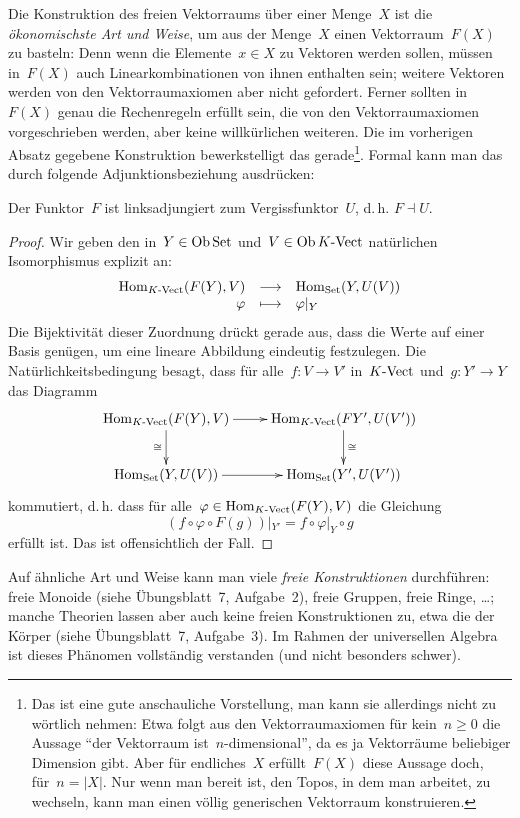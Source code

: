 Die Konstruktion des freien Vektorraums über einer Menge~$X$ ist die
\emph{ökonomischste Art und Weise}, um aus der Menge~$X$ einen
Vektorraum~$F(X)$ zu basteln: Denn wenn die Elemente~$x \in X$ zu Vektoren
werden sollen, müssen in~$F(X)$ auch Linearkombinationen von ihnen enthalten
sein; weitere Vektoren werden von den Vektorraumaxiomen aber nicht gefordert.
Ferner sollten in~$F(X)$ genau die Rechenregeln erfüllt sein, die von den
Vektorraumaxiomen vorgeschrieben werden, aber keine willkürlichen
weiteren. Die im vorherigen Absatz gegebene Konstruktion
bewerkstelligt das gerade\footnote{Das ist eine gute anschauliche Vorstellung, man kann sie
allerdings nicht zu wörtlich nehmen: Etwa folgt aus den Vektorraumaxiomen für
kein~$n \geq 0$ die Aussage "`der Vektorraum ist~$n$-dimensional"', da es ja
Vektorräume beliebiger Dimension gibt. Aber für endliches~$X$ erfüllt~$F(X)$
diese Aussage doch, für~$n = |X|$. Nur wenn man bereit ist, den Topos, in dem man
arbeitet, zu wechseln, kann man einen völlig generischen Vektorraum
konstruieren.}. Formal kann man das durch folgende Adjunktionsbeziehung
ausdrücken:
\begin{prop}Der Funktor~$F$ ist
linksadjungiert zum Vergissfunktor~$U$, d.\,h. $F \dashv U$.
\end{prop}
\begin{proof}
Wir geben den in~$Y \in \operatorname{Ob}\mathrm{Set}$ und~$V \in \operatorname{Ob}{K\text{-}\mathrm{Vect}}$ natürlichen
Isomorphismus explizit an:
\[ \begin{array}{@{}rcl@{}}
  \Hom_{\Vect{K}}(F(Y), V) &\longrightarrow& \Hom_\Set(Y, U(V)) \\
  \varphi &\longmapsto& \varphi|_Y
\end{array} \]
Die Bijektivität dieser Zuordnung drückt gerade aus, dass die Werte auf einer
Basis genügen, um eine lineare Abbildung eindeutig festzulegen. Die
Natürlichkeitsbedingung besagt, dass für alle~$f:V \to V'$ in~${K\text{-}\mathrm{Vect}}$ und~$g:Y' \to Y$
das Diagramm
\[ \xymatrix{
  \Hom_{\Vect{K}}(F(Y),V) \ar[r] \ar[d]_\cong & \Hom_{\Vect{K}}(FY',U(V')) \ar[d]^\cong \\
  \Hom_\Set(Y,U(V)) \ar[r] & \Hom_\Set(Y',U(V'))
} \]
kommutiert, d.\,h. dass für alle~$\varphi \in \mathrm{Hom}_{{K\text{-}\mathrm{Vect}}}(F(Y),V)$ die Gleichung
\[
  (f \circ \varphi \circ F(g))|_{Y'} = f \circ \varphi|_Y \circ g
\]
erfüllt ist. Das ist offensichtlich der Fall.
\end{proof}

Auf ähnliche Art und Weise kann man viele \emph{freie Konstruktionen}
durchführen: freie Monoide (siehe Übungsblatt~7, Aufgabe~2), freie Gruppen,
freie Ringe, \ldots; manche Theorien lassen aber auch keine freien
Konstruktionen zu, etwa die der Körper (siehe Übungsblatt~7, Aufgabe~3). Im
Rahmen der universellen Algebra ist dieses Phänomen vollständig verstanden (und
nicht besonders schwer).

